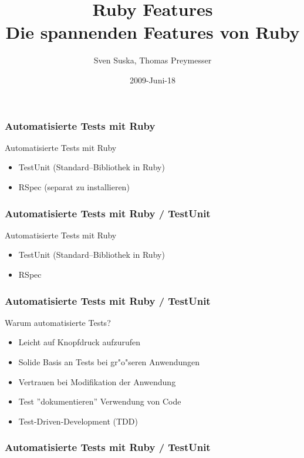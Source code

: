 \documentclass{beamer}
\title[Ruby]{Ruby Features\\Die spannenden Features von Ruby}
\author{Sven Suska, Thomas Preymesser}
\date{2009-Juni-18}
\begin{document}
\lstset{language=Ruby}
\lstset{basicstyle=\small,numbers=left, numberstyle=\tiny, numbersep=5pt}
\begin{frame}
\titlepage
\end{frame}










\begin{frame}
  \frametitle{Automatisierte Tests mit Ruby}
  Automatisierte Tests mit Ruby
  \begin{itemize}
    \item<1-> TestUnit (Standard--Bibliothek in Ruby)
    \item<2-> RSpec (separat zu installieren)
  \end{itemize}
\end{frame}

\begin{frame}
  \frametitle{Automatisierte Tests mit Ruby / TestUnit}
  Automatisierte Tests mit Ruby
  \begin{itemize}
    \item TestUnit (Standard--Bibliothek in Ruby)
    \pause
    \item RSpec 
  \end{itemize}
\end{frame}

\begin{frame}
  \frametitle{Automatisierte Tests mit Ruby / TestUnit}
  Warum automatisierte Tests?
  \begin{itemize}
    \item Leicht auf Knopfdruck aufzurufen
    \item Solide Basis an Tests bei gr"o"seren Anwendungen
    \item Vertrauen bei Modifikation der Anwendung
    \item Test ''dokumentieren'' Verwendung von Code
    \item Test-Driven-Development (TDD)
  \end{itemize}
\end{frame}

\begin{frame}[containsverbatim]
  \frametitle{Automatisierte Tests mit Ruby / TestUnit}

\end{frame}
\end{document}
